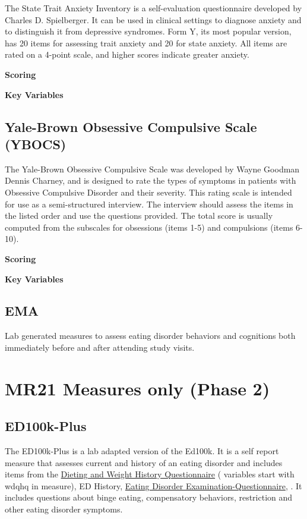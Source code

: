 \documentclass[
]{book}
\begin{document}
The State Trait Anxiety Inventory is a self-evaluation questionnaire
developed by Charles D. Spielberger. It can be used in clinical settings
to diagnose anxiety and to distinguish it from depressive syndromes.
Form Y, its most popular version, has 20 items for assessing trait
anxiety and 20 for state anxiety. All items are rated on a 4-point
scale, and higher scores indicate greater anxiety.

\textbf{Scoring}

\textbf{Key Variables}

\section{Yale-Brown Obsessive Compulsive Scale (YBOCS)}\label{yale-brown-obsessive-compulsive-scale-ybocs}

The Yale-Brown Obsessive Compulsive Scale was developed by Wayne Goodman
Dennis Charney, and is designed to rate the types of symptoms in
patients with Obsessive Compulsive Disorder and their severity. This
rating scale is intended for use as a semi-structured interview. The
interview should assess the items in the listed order and use the
questions provided. The total score is usually computed from the
subscales for obsessions (items 1-5) and compulsions (items 6-10).

\textbf{Scoring}

\textbf{Key Variables}

\section{EMA}\label{ema}

Lab generated measures to assess eating disorder behaviors and
cognitions both immediately before and after attending study visits.

\chapter{MR21 Measures only (Phase 2)}\label{mr21-measures-only-phase-2}

\section{ED100k-Plus}\label{ed100k-plus}

The ED100k-Plus is a lab adapted version of the Ed100k. It is a self
report measure that assesses current and history of an eating disorder
and includes items from the \href{https://pubmed.ncbi.nlm.nih.gov/23220357/}{Dieting and Weight History
Questionnaire} ( variables
start with wdqhq in measure), ED History, \href{https://pubmed.ncbi.nlm.nih.gov/15033501/}{Eating Disorder
Examination-Questionnaire}, .
It includes questions about binge eating, compensatory behaviors,
restriction and other eating disorder symptoms.
\end{document}
